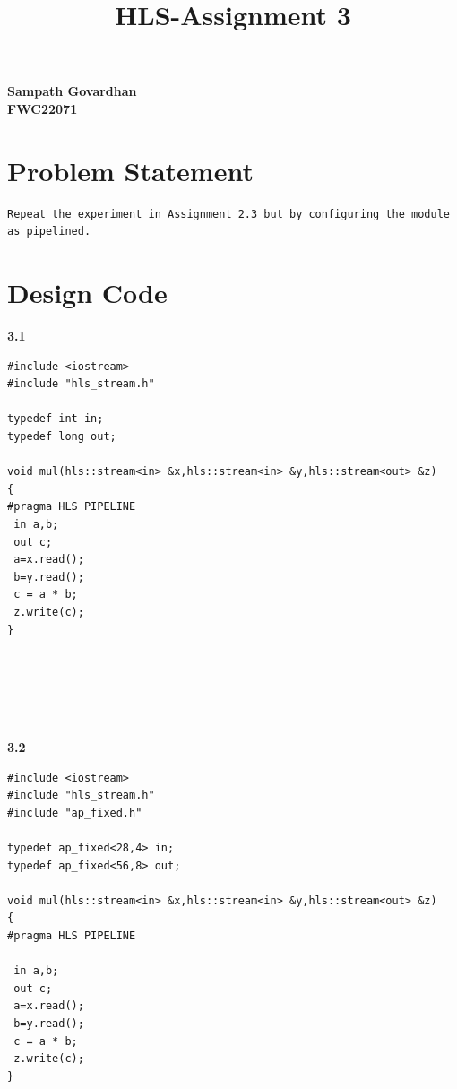 \documentclass{article}
\title{
HLS-Assignment 3
}
\begin{document}
\maketitle
\hfill \textbf{Sampath Govardhan} \\
\null \hfill \textbf{FWC22071}\\
\tableofcontents
\section{Problem Statement}
\begin{lstlisting}
Repeat the experiment in Assignment 2.3 but by configuring the module 
as pipelined.
\end{lstlisting}
\vspace{10cm}


\section{Design Code}
\textbf{3.1}
\begin{lstlisting}
#include <iostream>
#include "hls_stream.h"

typedef int in;
typedef long out;

void mul(hls::stream<in> &x,hls::stream<in> &y,hls::stream<out> &z)
{
#pragma HLS PIPELINE
 in a,b;
 out c;
 a=x.read();
 b=y.read();
 c = a * b;
 z.write(c);
}






\end{lstlisting}
\vspace{2cm}
\textbf{3.2}
\begin{lstlisting}
#include <iostream>
#include "hls_stream.h"
#include "ap_fixed.h"

typedef ap_fixed<28,4> in;
typedef ap_fixed<56,8> out;

void mul(hls::stream<in> &x,hls::stream<in> &y,hls::stream<out> &z)
{
#pragma HLS PIPELINE

 in a,b;
 out c;
 a=x.read();
 b=y.read();
 c = a * b;
 z.write(c);
}


\end{lstlisting}
\vspace{5cm}
\end{document}
